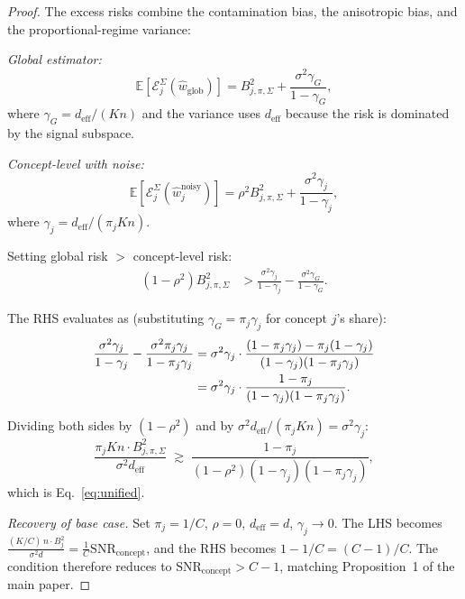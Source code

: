 \documentclass[11pt,a4paper]{article}
\newcommand{\E}{\mathbb{E}}
\newcommand{\SNR}{\mathrm{SNR}}
\newcommand{\what}{\hat{w}}
\newcommand{\deff}{d_{\mathrm{eff}}}
\begin{document}
\begin{proof}
The excess risks combine the contamination bias, the anisotropic bias, and the proportional-regime variance:

\emph{Global estimator:}
\begin{equation}
\E[\mathcal{E}_j^{\Sigma}(\what_{\mathrm{glob}})] = B_{j,\pi,\Sigma}^2 + \frac{\sigma^2 \gamma_G}{1 - \gamma_G},
\end{equation}
where $\gamma_G = \deff / (Kn)$ and the variance uses $\deff$ because the risk is dominated by the signal subspace.

\emph{Concept-level with noise:}
\begin{equation}
\E[\mathcal{E}_j^{\Sigma}(\what_j^{\mathrm{noisy}})] = \rho^2 B_{j,\pi,\Sigma}^2 + \frac{\sigma^2 \gamma_j}{1 - \gamma_j},
\end{equation}
where $\gamma_j = \deff / (\pi_j Kn)$.

Setting global risk $>$ concept-level risk:
\begin{align}
(1 - \rho^2) B_{j,\pi,\Sigma}^2 &> \frac{\sigma^2 \gamma_j}{1 - \gamma_j} - \frac{\sigma^2 \gamma_G}{1 - \gamma_G}.
\end{align}

The RHS evaluates as (substituting $\gamma_G = \pi_j \gamma_j$ for concept $j$'s share):
\begin{align}
\frac{\sigma^2 \gamma_j}{1 - \gamma_j} - \frac{\sigma^2 \pi_j \gamma_j}{1 - \pi_j\gamma_j}
&= \sigma^2 \gamma_j \cdot \frac{(1 - \pi_j\gamma_j) - \pi_j(1 - \gamma_j)}{(1-\gamma_j)(1-\pi_j\gamma_j)} \notag \\
&= \sigma^2 \gamma_j \cdot \frac{1 - \pi_j}{(1-\gamma_j)(1-\pi_j\gamma_j)}.
\end{align}

Dividing both sides by $(1-\rho^2)$ and by $\sigma^2 \deff / (\pi_j Kn) = \sigma^2 \gamma_j$:
\[
\frac{\pi_j K n \cdot B_{j,\pi,\Sigma}^2}{\sigma^2 \deff} \;\gtrsim\; \frac{1-\pi_j}{(1-\rho^2)(1-\gamma_j)(1-\pi_j\gamma_j)},
\]
which is Eq.~\eqref{eq:unified}.

\emph{Recovery of base case.} Set $\pi_j = 1/C$, $\rho = 0$, $\deff = d$, $\gamma_j \to 0$. The LHS becomes
$\frac{(K/C)\,n \cdot B_j^2}{\sigma^2 d} = \tfrac{1}{C}\SNR_{\mathrm{concept}}$, and the RHS becomes $1 - 1/C = (C-1)/C$. The condition therefore reduces to $\SNR_{\mathrm{concept}} > C - 1$, matching Proposition~1 of the main paper.
\end{proof}


\end{document}
